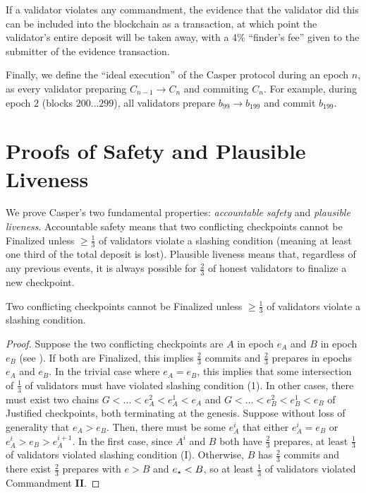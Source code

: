 \documentclass[12pt]{article}
\newcommand{\epoch}{\ensuremath{e}\xspace}
\newcommand{\epochsource}{\ensuremath{\epoch_{\star}}\space}
\newcommand{\Genesisblock}{\ensuremath{G}\xspace}
\begin{document}
If a validator violates any commandment, the evidence that the validator did this can be included into the blockchain as a transaction, at which point the validator's entire deposit will be taken away, with a 4\% ``finder's fee'' given to the submitter of the evidence transaction.


Finally, we define the ``ideal execution'' of the Casper protocol during an epoch $n$, as every validator preparing $C_{n-1} \to C_{n}$ and commiting $C_{n}$.  For example, during epoch $2$ (blocks $200 \ldots 299$), all validators prepare $b_{99} \to b_{199}$ and commit $b_{199}$.


\section{Proofs of Safety and Plausible Liveness}
\label{sect:theorems}

We prove Casper's two fundamental properties: \textit{accountable safety} and \textit{plausible liveness}. Accountable safety means that two conflicting checkpoints cannot be Finalized unless $\geq \frac{1}{3}$ of validators violate a slashing condition (meaning at least one third of the total deposit is lost).  Plausible liveness means that, regardless of any previous events, it is always possible for $\frac{2}{3}$ of honest validators to finalize a new checkpoint.

\begin{theorem}
\label{theorem:safety}
Two conflicting checkpoints cannot be Finalized unless $\geq \frac{1}{3}$ of validators violate a slashing condition.

\begin{proof}
Suppose the two conflicting checkpoints are $A$ in epoch $\epoch_A$ and $B$ in epoch $\epoch_B$ (see ). If both are Finalized, this implies $\frac{2}{3}$ commits and $\frac{2}{3}$ prepares in epochs $\epoch_A$ and $e_B$. In the trivial case where $\epoch_A = \epoch_B$, this implies that some intersection of $\frac{1}{3}$ of validators must have violated slashing condition (1). In other cases, there must exist two chains $\Genesisblock < \ldots < \epoch_A^2 < \epoch_A^1 < \epoch_A$ and $\Genesisblock < \ldots < \epoch_B^2 < \epoch_B^1 < \epoch_B$ of Justified checkpoints, both terminating at the genesis. Suppose without loss of generality that $\epoch_A > \epoch_B$. Then, there must be some $\epoch_A^i$ that either $\epoch_A^i = \epoch_B$ or $\epoch_A^i > \epoch_B > \epoch_A^{i+1}$. In the first case, since $A^i$ and $B$ both have $\frac{2}{3}$ prepares, at least $\frac{1}{3}$ of validators violated slashing condition (I). Otherwise, $B$ has $\frac{2}{3}$ commits and there exist $\frac{2}{3}$ prepares with $\epoch > B$ and $\epochsource < B$, so at least $\frac{1}{3}$ of validators violated Commandment \textbf{II}.
\end{proof}
\end{theorem}
\end{document}
